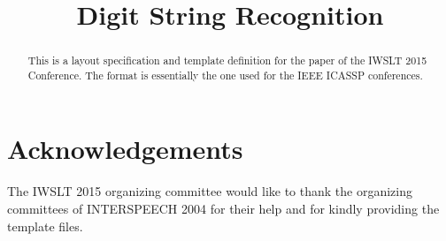 \documentclass[a4paper]{article}
\title{Digit String Recognition}
\begin{document}
\maketitle
%
\begin{abstract}
This is a layout specification and template
definition for the paper of the IWSLT 2015 Conference. 
The format is essentially the one used for the IEEE ICASSP conferences.
\end{abstract}


%








\section{Acknowledgements}
The IWSLT 2015 organizing committee would like to thank the
organizing committees of INTERSPEECH 2004 for their
help and for kindly providing the template files.

%



\end{document}
